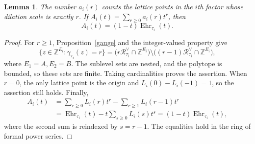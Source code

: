 \documentclass[11pt,reqno]{amsart}
\numberwithin{equation}{section}
\newtheorem{lemma}[theorem]{Lemma}
\theoremstyle{definition}
\theoremstyle{remark}
\theoremstyle{definition}
\newcommand{\Rpoly}[1]{\mathcal R_{#1}^{\vee}}
\DeclareMathOperator{\Ehr}{Ehr}
\begin{document}
\begin{lemma}\label{shell}
The number $a_i(r)$ counts the lattice points in the $i$th factor whose dilation scale is exactly $r$. If
$A_i(t)=\sum_{r\ge0}a_i(r)t^r$, then
\begin{equation}\label{shellseries}
A_i(t)=(1-t)\Ehr_{\tau_i}(t).
\end{equation}
\end{lemma}
\begin{proof}
For $r\ge1$, Proposition~\ref{gauge} and the integer-valued property give
\[
\{z\in\mathbb Z^{E_i}:\gamma_{\tau_i}(z)=r\}
 =\bigl(r\Rpoly{\tau_i}\cap\mathbb Z^{E_i}\bigr)
   \setminus\bigl((r-1)\Rpoly{\tau_i}\cap\mathbb Z^{E_i}\bigr),
\]
where $E_1=A,E_2=B$. The sublevel sets are nested, and the polytope is bounded, so these sets are finite. Taking cardinalities proves the assertion. When $r=0$, the only lattice point is the origin and $L_i(0)-L_i(-1)=1$, so the assertion still holds. Finally,
\begin{align*}
A_i(t)&=\sum_{r\ge0}L_i(r)t^r-\sum_{r\ge1}L_i(r-1)t^r\\
 &=\Ehr_{\tau_i}(t)-t\sum_{s\ge0}L_i(s)t^s
 =(1-t)\Ehr_{\tau_i}(t),
\end{align*}
where the second sum is reindexed by $s=r-1$. The equalities hold in the ring of formal power series.
\end{proof}
\end{document}
